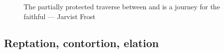\begin{figure}[t!]
\checkoddpage \ifoddpage \forcerectofloat \else \forceversofloat \fi
\centering
{}
\caption{The partially protected traverse between  and  is a journey for the faithful --- Jarvist Frost}
\label{traverse}
\end{figure}

\subsection{Reptation, contortion, elation}

